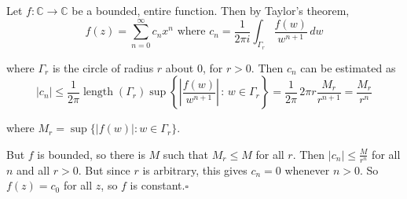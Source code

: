 \documentclass[12pt]{article}
\begin{document}
Let $f:\mathbb{C}\to\mathbb{C}$ be a bounded, entire function.  Then by Taylor's theorem, $$f(z)=\sum_{n=0}^\infty c_n x^n \mbox{ where } c_n = \frac{1}{2\pi i}\int_{\Gamma_r} \frac{f(w)}{w^{n+1}}\,dw$$

where $\Gamma_r$ is the circle of radius $r$ about $0$, for $r>0$.  Then $c_n$ can be estimated as $$|c_n|\leq\frac{1}{2\pi}\operatorname{length}(\Gamma_r)\operatorname{sup}\left\{\left|\frac{f(w)}{w^{n+1}}\right|\,\colon\, w\in \Gamma_r\right\} = \frac{1}{2\pi}\, 2\pi r \frac{M_r}{r^{n+1}} = \frac{M_r}{r^{n}}$$

where $M_r = \operatorname{sup}\{|f(w)|\colon w\in\Gamma_r\}$.

But $f$ is bounded, so there is $M$ such that $M_r\leq M$ for all $r$.  Then $|c_n|\leq\frac{M}{r^n}$ for all $n$ and all $r>0$.  But since $r$ is arbitrary, this gives $c_n = 0$ whenever $n>0$.  So $f(z) = c_0$ for all $z$, so $f$ is constant.$\square$
\end{document}
